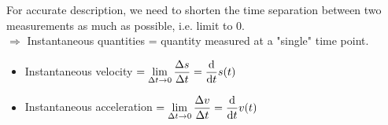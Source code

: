 \documentclass[class=article, crop=false, 12pt]{standalone}
\begin{document}
For accurate description, we need to shorten the time separation between two measurements as much as possible, i.e. limit to $0$.\\
$\Rightarrow$ Instantaneous quantities = quantity measured at a "single" time point.

\begin{itemize}
    \item Instantaneous velocity $= \displaystyle \lim_{\Delta t\to 0} \dfrac{\Delta s}{\Delta t} = \dvv{t}s(t)$
    \item Instantaneous acceleration $= \displaystyle \lim_{\Delta t \to 0} \dfrac{\Delta v}{\Delta t} = \dvv{t}v(t)$ 
\end{itemize}
\\
\end{document}
